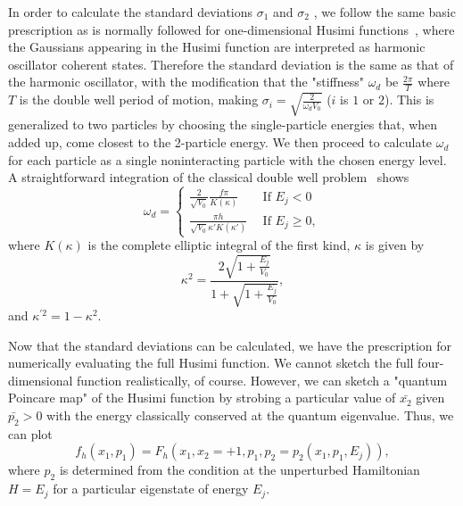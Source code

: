 In order to calculate the standard deviations ${\sigma}_1$ and $\sigma_2$ , we follow the same basic prescription as is normally followed for one-dimensional Husimi functions~\cite{novaes}, where the Gaussians appearing in the Husimi function are  interpreted as harmonic oscillator coherent states. Therefore the standard deviation is the same as that of the harmonic oscillator, with the modification that the "stiffness" $\omega_d$ be $\frac{2\pi}{T}$ where $T$ is the double well period of motion, making $\sigma_i=\sqrt{\frac{2}{\omega_d V_0}}$ ($i$ is $1$ or $2$). This is generalized to two particles by choosing the single-particle energies that, when added up, come closest to the 2-particle energy.
We then proceed to calculate $\omega_d$ for each particle as a single noninteracting particle with the chosen energy level. A straightforward integration of the classical double well problem~\cite{reichl-appendix} shows
%
\begin{equation}
\omega_d =
\begin{cases}
\frac{2}{\sqrt{V_0}}\frac{f\pi}{K(\kappa)}& ~~\text{If $E_j<0$} \\
\frac{\pi h}{\sqrt{V_0}\kappa'K(\kappa')}& ~~\text{If $E_j\geq 0$},
\end{cases}
\end{equation}
%
where  $K(\kappa)$  is the complete elliptic integral of the first kind, $\kappa$ is given by
%
\begin{equation}
\kappa^2=\frac{2\sqrt{1+\frac{E_j}{V_0}}}{1+\sqrt{1+\frac{E_j}{V_0}}},
\end{equation}
%
and ${\kappa}^{'2}=1-{\kappa}^2$. 

Now that the standard deviations can be calculated, we have the prescription for numerically evaluating the full Husimi function. We cannot sketch the full four- dimensional function realistically, of course. However, we can sketch a "quantum Poincare map" of the Husimi function by strobing a particular value of $\bar{x_2}$ given $\bar{p_2} > 0$ with  the energy  classically conserved at the quantum eigenvalue. Thus, we can plot
%
\begin{equation}
f_h(x_1,p_1) = F_h (x_1, x_2 = +1, p_1, 
 p_2=p_2(x_1,p_1,E_j)),
\label{eq:husimi_section}
\end{equation}
%
where $p_2$ is determined from the condition at the unperturbed Hamiltonian  $H= E_j$ for a particular eigenstate of energy $E_j$.

